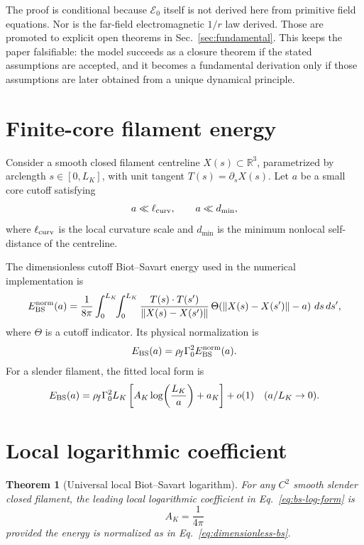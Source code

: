 \documentclass[11pt]{article}
\newcommand{\rhof}{\rho_{\!f}}
\newcommand{\Ezero}{\mathcal E_0}
\newtheorem{theorem}{Theorem}
\begin{document}
The proof is conditional because \(\Ezero\) itself is not derived here from primitive field
equations.  Nor is the far-field electromagnetic \(1/r\) law derived.  Those are promoted to
explicit open theorems in Sec.~\ref{sec:fundamental}.  This keeps the paper falsifiable:
the model succeeds as a closure theorem if the stated assumptions are accepted, and it becomes
a fundamental derivation only if those assumptions are later obtained from a unique dynamical
principle.

\section{Finite-core filament energy}

Consider a smooth closed filament centreline \(X(s)\subset\mathbb R^3\), parametrized by
arclength \(s\in[0,L_K]\), with unit tangent \(T(s)=\partial_s X(s)\).  Let \(a\) be a small
core cutoff satisfying
\[
  a\ll \ell_{\rm curv},\qquad a\ll d_{\min},
\]
where \(\ell_{\rm curv}\) is the local curvature scale and \(d_{\min}\) is the minimum
nonlocal self-distance of the centreline.

The dimensionless cutoff Biot--Savart energy used in the numerical implementation is
\begin{equation}
  E_{\rm BS}^{\rm norm}(a)
  =
  \frac{1}{8\pi}
  \int_{0}^{L_K}\!\!\int_{0}^{L_K}
  \frac{T(s)\cdot T(s')}{\lVert X(s)-X(s')\rVert}
  \,\Theta\!\left(\lVert X(s)-X(s')\rVert-a\right)\,ds\,ds',
  \label{eq:dimensionless-bs}
\end{equation}
where \(\Theta\) is a cutoff indicator.  Its physical normalization is
\begin{equation}
  E_{\rm BS}(a)
  =
  \rhof\Gamma_0^2
  E_{\rm BS}^{\rm norm}(a).
\end{equation}
For a slender filament, the fitted local form is
\begin{equation}
  E_{\rm BS}(a)
  =
  \rhof\Gamma_0^2 L_K
  \left[
  A_K\log\!\left(\frac{L_K}{a}\right)+a_K
  \right]
  +
  o(1)
  \quad(a/L_K\to0).
  \label{eq:bs-log-form}
\end{equation}

\section{Local logarithmic coefficient}
\label{sec:AK}

\begin{theorem}[Universal local Biot--Savart logarithm]
For any \(C^2\) smooth slender closed filament, the leading local logarithmic coefficient in
Eq.~\eqref{eq:bs-log-form} is
\[
  A_K=\frac{1}{4\pi}
\]
provided the energy is normalized as in Eq.~\eqref{eq:dimensionless-bs}.
\end{theorem}
\end{document}
